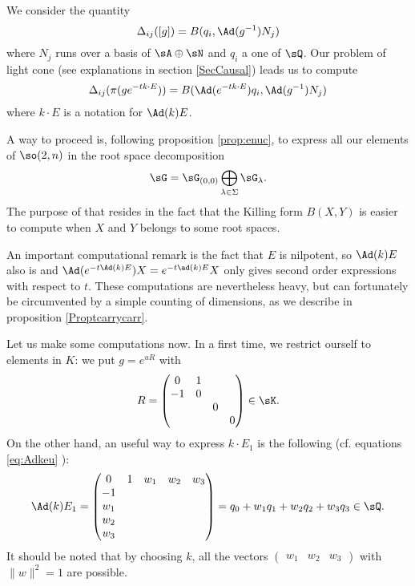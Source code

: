 We consider the quantity 
\[
\Delta_{ij}([g])=B(q_i,\Ad(g^{-1})N_j)
\]
where $N_j$ runs over a basis of $\sA\oplus\sN$ and $q_i$ a one of $\sQ$. Our problem of light cone (see explanations in section \ref{SecCausal}) leads us to compute
 \begin{equation} \label{eq:elemtr}
\Delta_{ij}(\pi(ge^{-tk\cdot E}))=B(\Ad(e^{-tk\cdot
E})q_i,\Ad(g^{-1})N_j)
\end{equation}
where $k\cdot E$ is a notation for $\Ad(k)E$.

A way to proceed is, following proposition \ref{prop:enuc},  to express all our elements of $\so(2,n)$ in the root space decomposition
\[
\sG=\sG_{(0,0)}\bigoplus_{\lambda\in\Sigma}\sG_{\lambda}.
\]
The purpose of that resides in the fact that the Killing form $B(X,Y)$ is easier to compute when $X$ and $Y$ belongs to some root spaces.

An important computational remark is the fact that $E$ is nilpotent, so $\Ad(k)E$ also is and $\Ad(e^{-t\Ad(k)E})X=e^{-t\ad(k)E}X$ only gives second order expressions with respect to $t$. These computations are nevertheless heavy, but can fortunately be circumvented by a simple counting of dimensions, as we describe in proposition \ref{Proptcarrycarr}.

Let us make some computations now. In a first time, we restrict ourself to elements in $K$: we put $g=e^{uR}$ with
\[
R=
\begin{pmatrix}
0&1\\
-1&0\\
&&0\\
&&&0
\end{pmatrix}\in\sK.
\]
On the other hand, an useful way to express $k\cdot E_1$ is the following (cf. equations \eqref{eq:Adkeu} ):
\[
\Ad(k)E_1=
\begin{pmatrix}
0&1&w_1&w_2&w_3\\
-1\\
w_1\\
w_2\\
w_3
\end{pmatrix}
=q_0+w_1q_1+w_2q_2+w_3q_3\in \sQ.
\]
It should be noted that by choosing $k$, all the vectors $\begin{pmatrix}w_1&w_2&w_3\end{pmatrix}$ with $\|w\|^2=1$ are possible.

